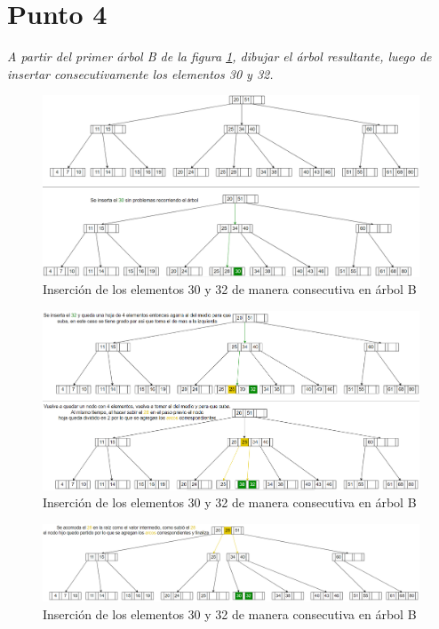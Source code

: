 \newpage
\section{Punto 4}
\textit{A partir del primer árbol B de la figura \ref{fig:Arbol1}, dibujar el árbol resultante, luego de insertar consecutivamente los
elementos 30 y 32.
}\\
\begin{figure}
  \centering
  \includegraphics[width=\textwidth, scale=1]{Images/Punto4/Arbol1.png}
  \caption{Inserción de los elementos 30 y 32 de manera consecutiva en árbol B}
  \label{fig:Arbol1}
\end{figure}

\begin{figure}
  \centering
  \includegraphics[width=\textwidth, scale=1]{Images/Punto4/Arbol2.png}
  \caption{Inserción de los elementos 30 y 32 de manera consecutiva en árbol B}
  \label{fig:Arbol2}
\end{figure}

\begin{figure}
  \centering
  \includegraphics[width=\textwidth, scale=1]{Images/Punto4/Arbol3.png}
  \caption{Inserción de los elementos 30 y 32 de manera consecutiva en árbol B}
  \label{fig:Arbol3}
\end{figure}
